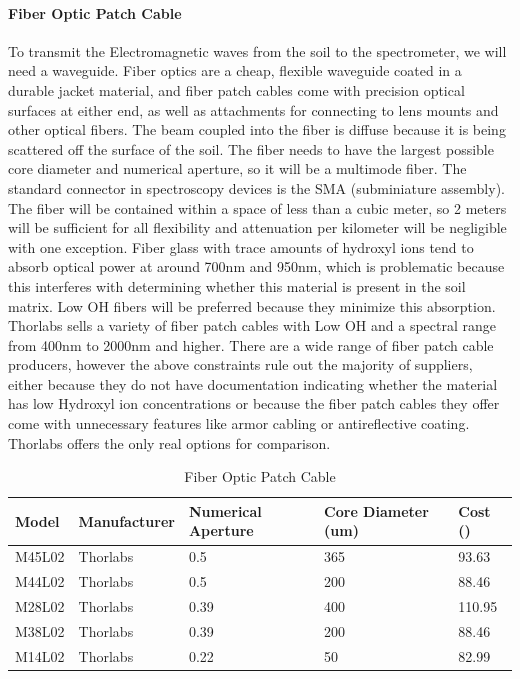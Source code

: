 \paragraph{Fiber Optic Patch Cable}

To transmit the Electromagnetic waves from the soil to the spectrometer, we will need a waveguide. Fiber optics are a cheap, flexible waveguide coated in a durable jacket material, and fiber patch cables come with precision optical surfaces at either end, as well as attachments for connecting to lens mounts and other optical fibers. The beam coupled into the fiber is diffuse because it is being scattered off the surface of the soil. The fiber needs to have the largest possible core diameter and numerical aperture, so it will be a multimode fiber. The standard connector in spectroscopy devices is the SMA (subminiature assembly). The fiber will be contained within a space of less than a cubic meter, so 2 meters will be sufficient for all flexibility and attenuation per kilometer will be negligible with one exception. Fiber glass with trace amounts of hydroxyl ions tend to absorb optical power at around 700nm and 950nm, which is problematic because this interferes with determining whether this material is present in the soil matrix. Low OH fibers will be preferred because they minimize this absorption. Thorlabs sells a variety of fiber patch cables with Low OH and a spectral range from 400nm to 2000nm and higher.
There are a wide range of fiber patch cable producers, however the above constraints rule out the majority of suppliers, either because they do not have documentation indicating whether the material has low Hydroxyl ion concentrations or because the fiber patch cables they offer come with unnecessary features like armor cabling or antireflective coating. Thorlabs offers the only real options for comparison.

\begin{table}[H]
	\centering
	\label{table:Fiber Optic Patch Cable}
	\caption{Fiber Optic Patch Cable}
	\bigskip
	\begin{tabular}{|p{2cm}|p{2.5cm}|p{2cm}|p{2.75cm}|p{1.75cm}|}
	\hline
	Model & Manufacturer & Numerical Aperture & Core Diameter (um) & Cost (\textdollar)\\
	\hline
	M45L02 & Thorlabs & 0.5 & 365 & 93.63\\
	\hline
	M44L02 & Thorlabs & 0.5 & 200 & 88.46\\
	\hline
	M28L02 & Thorlabs & 0.39 & 400 & 110.95\\
	\hline
	M38L02 & Thorlabs & 0.39 & 200 & 88.46\\
	\hline
	M14L02 & Thorlabs & 0.22 & 50 & 82.99\\
	\hline
	\end{tabular}
\end{table}

